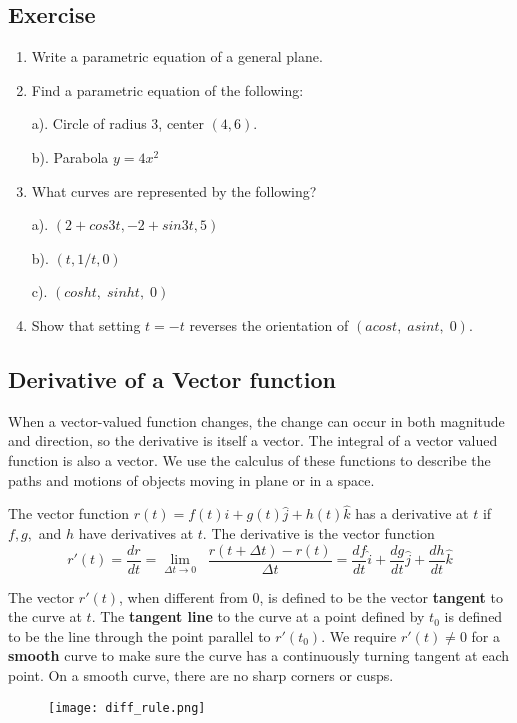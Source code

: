 \documentclass[aima331_lecturenotes_ku.tex]{subfiles}
\begin{document}
\subsection{Exercise}
\begin{enumerate}
\item Write a parametric equation of a general plane.
\item Find a parametric equation of the following:
  \begin{multicols}{2}
    a). Circle of radius 3, center $(4,6)$.
    \columnbreak

    b). Parabola $y=4x^2$
  \end{multicols}

\item What curves are represented by the following?
  \begin{multicols}{3}
    a). $(2+cos3t, -2+sin3t, 5)$
    \columnbreak


    b). $(t, 1/t, 0)$
    \columnbreak

    c). $(cosht, \;sinht, \;0)$
  \end{multicols}
\item Show that setting $t=-t$ reverses the orientation of $(acost, \; asint, \; 0)$.
\end{enumerate}

\subsection{Derivative of a Vector function}
When a vector-valued function changes, the change can occur in both magnitude and direction, so the derivative is itself a vector. The integral of a vector valued function is also a vector. We use the calculus of these functions to describe the paths and motions of objects moving in plane or in a space.
\begin{mdframed}
  The vector function $r(t) = f(t)\hat{i} + g(t)\hat{j} + h(t)\hat{k}$ has a derivative at $t$ if $f,g,$ and $h$ have derivatives at $t$. The derivative is the vector function
  $$r'(t) = \frac{dr}{dt} = \lim_{\Delta t \to 0}\;\; \frac{r(t+\Delta t) - r(t)}{\Delta t} = \frac{df}{dt}\hat{i} + \frac{dg}{dt}\hat{j} + \frac{dh}{dt}\hat{k}$$
\end{mdframed}
The vector $r'(t)$, when different from $0$, is defined to be the vector \textbf{tangent} to the curve at $t$. The \textbf{tangent line} to the curve at a point defined by $t_0$ is defined to be the line through the point parallel to $r'(t_0)$. We require $r'(t) \neq 0 $ for a \textbf{smooth} curve to make sure the curve has a continuously turning tangent at each point. On a smooth curve, there are no sharp corners or cusps.
\begin{figure}[h]
  \centering
  \texttt{[image: diff\_rule.png]}
\end{figure}
\end{document}
